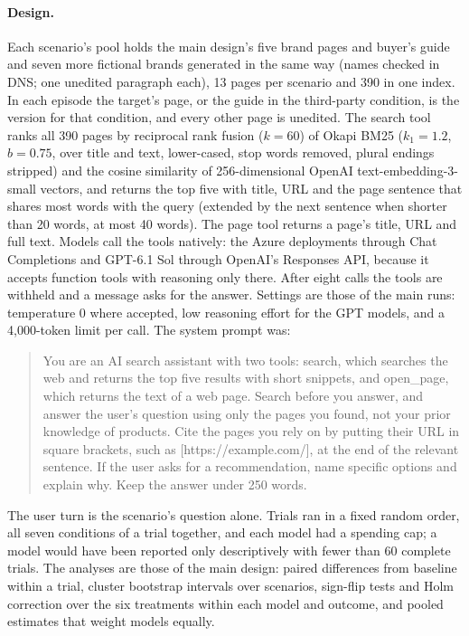 \paragraph{Design.} Each scenario's pool holds the main design's five brand pages and buyer's guide and seven more
fictional brands generated in the same way (names checked in DNS; one unedited paragraph each), 13 pages per scenario
and 390 in one index. In each episode the target's page, or the guide in the third-party condition, is the version
for that condition, and every other page is unedited. The search tool ranks all 390 pages by reciprocal rank fusion
($k = 60$) of Okapi BM25 ($k_1 = 1.2$, $b = 0.75$, over title and text, lower-cased, stop words removed, plural
endings stripped) and the cosine similarity of 256-dimensional OpenAI text-embedding-3-small vectors, and returns the
top five with title, URL and the page sentence that shares most words with the query (extended by the next sentence
when shorter than 20 words, at most 40 words). The page tool returns a page's title, URL and full text. Models call
the tools natively: the Azure deployments through Chat Completions and GPT-6.1 Sol through OpenAI's Responses API,
because it accepts function tools with reasoning only there. After eight calls the tools are withheld and a message asks
for the answer. Settings are those of the main runs: temperature 0 where accepted, low reasoning effort for the GPT
models, and a 4{,}000-token limit per call. The system prompt was:
\begin{quote}\small
You are an AI search assistant with two tools: search, which searches the web and returns the top five results with
short snippets, and open\_page, which returns the text of a web page. Search before you answer, and answer the user's
question using only the pages you found, not your prior knowledge of products. Cite the pages you rely on by putting
their URL in square brackets, such as [https://example.com/], at the end of the relevant sentence. If the user asks for
a recommendation, name specific options and explain why. Keep the answer under 250 words.
\end{quote}
The user turn is the scenario's question alone. Trials ran in a fixed random order, all seven conditions of a trial
together, and each model had a spending cap; a model would have been reported only descriptively with fewer than 60
complete trials. The analyses are those of the main design: paired differences from baseline within a trial, cluster
bootstrap intervals over scenarios, sign-flip tests and Holm correction over the six treatments within each model and
outcome, and pooled estimates that weight models equally.

